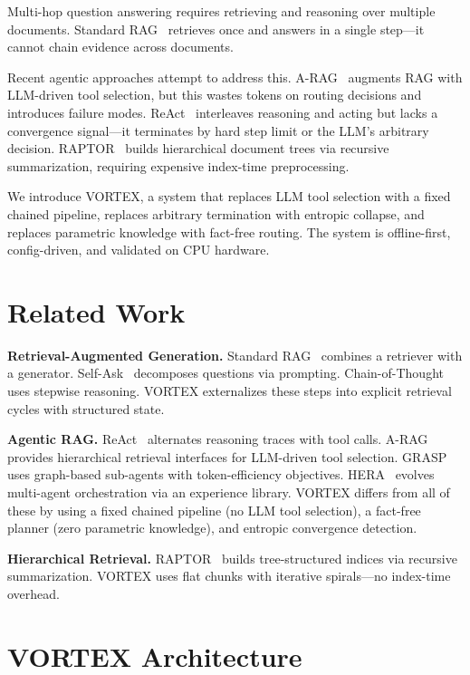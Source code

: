 \documentclass{zapiski}
\begin{document}
Multi-hop question answering requires retrieving and reasoning over multiple documents. Standard RAG~\cite{lewis2020rag} retrieves once and answers in a single step---it cannot chain evidence across documents.

Recent agentic approaches attempt to address this. A-RAG~\cite{du2026arag} augments RAG with LLM-driven tool selection, but this wastes tokens on routing decisions and introduces failure modes. ReAct~\cite{yao2022react} interleaves reasoning and acting but lacks a convergence signal---it terminates by hard step limit or the LLM's arbitrary decision. RAPTOR~\cite{sarthi2024raptor} builds hierarchical document trees via recursive summarization, requiring expensive index-time preprocessing.

We introduce VORTEX, a system that replaces LLM tool selection with a fixed chained pipeline, replaces arbitrary termination with entropic collapse, and replaces parametric knowledge with fact-free routing. The system is offline-first, config-driven, and validated on CPU hardware.

\section{Related Work}
\label{sec:related}

\textbf{Retrieval-Augmented Generation.} Standard RAG~\cite{lewis2020rag} combines a retriever with a generator. Self-Ask~\cite{press2022selfask} decomposes questions via prompting. Chain-of-Thought~\cite{wei2022cot} uses stepwise reasoning. VORTEX externalizes these steps into explicit retrieval cycles with structured state.

\textbf{Agentic RAG.} ReAct~\cite{yao2022react} alternates reasoning traces with tool calls. A-RAG~\cite{du2026arag} provides hierarchical retrieval interfaces for LLM-driven tool selection. GRASP~\cite{lelong2025grasp} uses graph-based sub-agents with token-efficiency objectives. HERA~\cite{du2026hera} evolves multi-agent orchestration via an experience library. VORTEX differs from all of these by using a fixed chained pipeline (no LLM tool selection), a fact-free planner (zero parametric knowledge), and entropic convergence detection.

\textbf{Hierarchical Retrieval.} RAPTOR~\cite{sarthi2024raptor} builds tree-structured indices via recursive summarization. VORTEX uses flat chunks with iterative spirals---no index-time overhead.

\section{VORTEX Architecture}
\label{sec:architecture}
\end{document}
